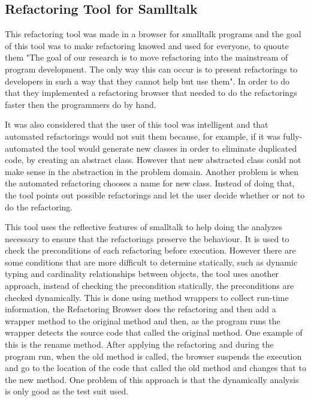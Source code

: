 \subsection{Refactoring Tool for Samlltalk}%

This refactoring tool \cite{roberts1997refactoring} was made in a browser for smalltalk programs and the goal of this tool was to make refactoring knowed and used for everyone, to quoute them "The goal of our research is to move refactoring into the mainstream of program development. The only way this can occur is to present refactorings to developers in such a way that they cannot help but use them". 
In order to do that they implemented a refactoring browser that needed to do the refactorings faster then the programmers do by hand. 

It was also considered that the user of this tool was intelligent and that automated refactorings would not suit them because, for example, if it was fully-automated the tool would generate new classes in order to eliminate duplicated code, by creating an abstract class. However that new abstracted class could not make sense in the abstraction in the problem domain. Another problem is when the automated refactoring chooses a name for new class. Instead of doing that, the tool points out possible refactorings and let the user decide whether or not to do the refactoring.

This tool uses the reflective features of smalltalk to help doing the analyzes necessary to ensure that the refactorings preserve the behaviour. 
It is used to check the preconditions of each refactoring before execution. However there are some conditions that are more difficult to determine statically, such as dynamic typing and cardinality relationships between objects, the tool uses another approach, instead of checking the precondition statically, the preconditions are checked dynamically. 
This is done using method wrappers to collect run-time information, the Refactoring Browser does the refactoring and then add a wrapper method to the original method and then, as the program runs the wrapper detects the source code that called the original method.
One example of this is the rename method. After applying the refactoring and during the program run, when the old method is called, the browser suspends the execution and go to the location of the code that called the old method and changes that to the new method. One problem of this approach is that the dynamically analysis is only good as the test suit used.